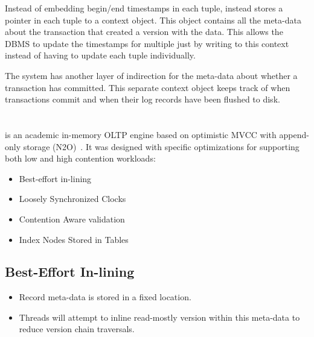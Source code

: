 \documentclass[11pt]{article}
\begin{document}
Instead of embedding begin/end timestamps in each tuple,  instead stores a 
pointer in each tuple to a context object. This object contains all the meta-data about the 
transaction that created a version with the data. This allows the DBMS to update the timestamps for 
multiple just by writing to this context instead of having to update each tuple individually.

The system has another layer of indirection for the meta-data about whether a transaction has 
committed. This separate context object keeps track of when transactions commit and when their log 
records have been flushed to disk.

\section{}
 is an academic in-memory OLTP engine based on optimistic MVCC with append-only 
storage (N2O)~\cite{p21-lim}. It was designed with specific optimizations for supporting both low 
and high contention workloads:
\begin{itemize}
    \item Best-effort in-lining
    \item Loosely Synchronized Clocks
    \item Contention Aware validation
    \item Index Nodes Stored in Tables
\end{itemize}

\subsection*{Best-Effort In-lining}
\begin{itemize}
    \item
    Record meta-data is stored in a fixed location.
    
    \item
    Threads will attempt to inline read-mostly version within this meta-data to reduce 
    version chain traversals.
\end{itemize}

\end{document}
